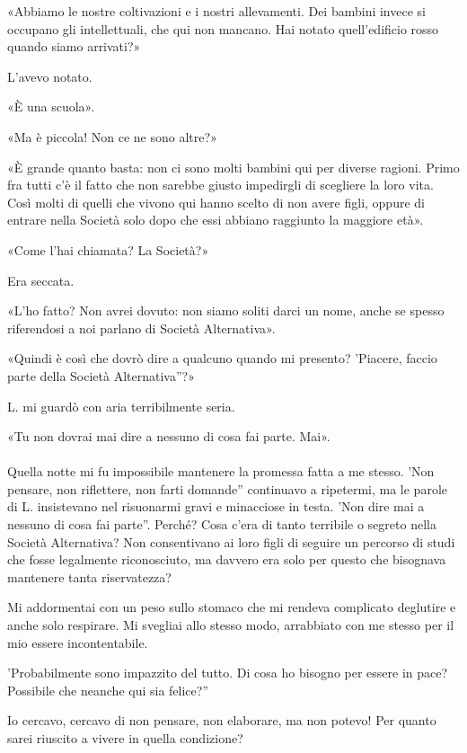 \documentclass[a4paper,12pt]{book}
\begin{document}
«Abbiamo le nostre coltivazioni e i nostri allevamenti. Dei bambini invece si
occupano gli intellettuali, che qui non mancano. Hai notato quell'edificio rosso
quando siamo arrivati?»

L'avevo notato.

«È una scuola».

«Ma è piccola! Non ce ne sono altre?»

«È grande quanto basta: non ci sono molti bambini qui per diverse ragioni. Primo
fra tutti c'è il fatto che non sarebbe giusto impedirgli di scegliere la loro
vita. Così molti di quelli che vivono qui hanno scelto di non avere figli,
oppure di entrare nella Società solo dopo che essi abbiano raggiunto la maggiore
età».

«Come l'hai chiamata? La Società?»

Era seccata.

«L'ho fatto? Non avrei dovuto: non siamo soliti darci un nome, anche se spesso
riferendosi a noi parlano di Società Alternativa».

«Quindi è così che dovrò dire a qualcuno quando mi presento? 'Piacere, faccio
parte della Società Alternativa''?»

L. mi guardò con aria terribilmente seria.

«Tu non dovrai mai dire a nessuno di cosa fai parte. Mai».

\paragraph{}
Quella notte mi fu impossibile mantenere la promessa fatta a me stesso. 'Non
pensare, non riflettere, non farti domande'' continuavo a ripetermi, ma le parole
di L. insistevano nel risuonarmi gravi e minacciose in testa. 'Non dire mai a
nessuno di cosa fai parte''. Perché? Cosa c'era di tanto terribile o segreto nella
Società Alternativa? Non consentivano ai loro figli di seguire un percorso di
studi che fosse legalmente riconosciuto, ma davvero era solo per questo che
bisognava mantenere tanta riservatezza?

Mi addormentai con un peso sullo stomaco che mi rendeva complicato deglutire e
anche solo respirare. Mi svegliai allo stesso modo, arrabbiato con me stesso
per il mio essere incontentabile.

'Probabilmente sono impazzito del tutto. Di cosa ho bisogno per essere in pace?
Possibile che neanche qui sia felice?''

Io cercavo, cercavo di non pensare, non elaborare, ma non potevo! Per quanto
sarei riuscito a vivere in quella condizione?
\end{document}

